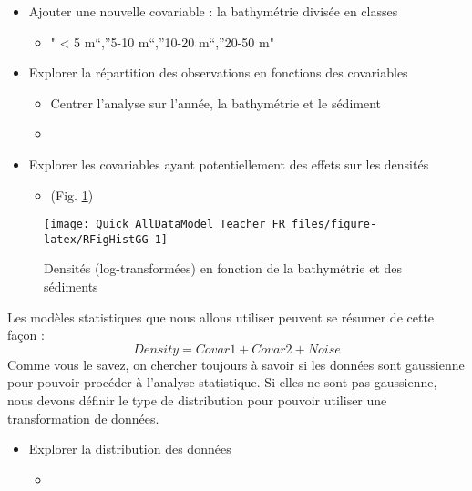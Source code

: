 \documentclass[french,a4paper]{article}
\providecommand{\tightlist}{%
  \setlength{\itemsep}{0pt}\setlength{\parskip}{0pt}}
\begin{document}
\begin{itemize}
\tightlist
\item
  Ajouter une nouvelle covariable : la bathymétrie divisée en classes

  \begin{itemize}
  \tightlist
  \item
    " \textless{} 5 m``,''5-10 m``,''10-20 m``,''20-50 m"
  \end{itemize}
\item
  Explorer la répartition des observations en fonctions des covariables

  \begin{itemize}
  \item
    Centrer l'analyse sur l'année, la bathymétrie et le sédiment
  \item
  \end{itemize}
\item
  Explorer les covariables ayant potentiellement des effets sur les
  densités

  \begin{itemize}
  \tightlist
  \item
    (Fig.
    \ref{fig:RFigHistGG})
  \end{itemize}
\end{itemize}




\begin{figure}[!h]

{\centering \texttt{[image: Quick\_AllDataModel\_Teacher\_FR\_files/figure-latex/RFigHistGG-1]} 

}

\caption{Densités (log-transformées) en fonction de la
bathymétrie et des sédiments}\label{fig:RFigHistGG}
\end{figure}

Les modèles statistiques que nous allons utiliser peuvent se résumer de
cette façon : \[Density = Covar1 + Covar2 + Noise\] Comme vous le savez,
on chercher toujours à savoir si les données sont gaussienne pour
pouvoir procéder à l'analyse statistique. Si elles ne sont pas
gaussienne, nous devons définir le type de distribution pour pouvoir
utiliser une transformation de données.

\begin{itemize}
\tightlist
\item
  Explorer la distribution des données

  \begin{itemize}
  \item
  \end{itemize}
\end{itemize}
\end{document}

